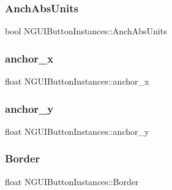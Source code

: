 \subsubsection{\texorpdfstring{Anch\+Abs\+Units}{AnchAbsUnits}}
{\footnotesize\ttfamily bool N\+G\+U\+I\+Button\+Instances\+::\+Anch\+Abs\+Units}

\hypertarget{class_n_g_u_i_button_instances_a89db1f273341c3a618247fee72b4f8d7}{}\label{class_n_g_u_i_button_instances_a89db1f273341c3a618247fee72b4f8d7} 
\subsubsection{\texorpdfstring{anchor\+\_\+x}{anchor\_x}}
{\footnotesize\ttfamily float N\+G\+U\+I\+Button\+Instances\+::anchor\+\_\+x}

\hypertarget{class_n_g_u_i_button_instances_ac83c6f5fb323cdb7810376ab0f825bc1}{}\label{class_n_g_u_i_button_instances_ac83c6f5fb323cdb7810376ab0f825bc1} 
\subsubsection{\texorpdfstring{anchor\+\_\+y}{anchor\_y}}
{\footnotesize\ttfamily float N\+G\+U\+I\+Button\+Instances\+::anchor\+\_\+y}

\hypertarget{class_n_g_u_i_button_instances_ac304037f6abf38edad843c23d63e3bdc}{}\label{class_n_g_u_i_button_instances_ac304037f6abf38edad843c23d63e3bdc} 
\subsubsection{\texorpdfstring{Border}{Border}}
{\footnotesize\ttfamily float N\+G\+U\+I\+Button\+Instances\+::\+Border}

\hypertarget{class_n_g_u_i_button_instances_ac8810d3675c727c8655ca7024c7b0d26}{}\label{class_n_g_u_i_button_instances_ac8810d3675c727c8655ca7024c7b0d26} 
